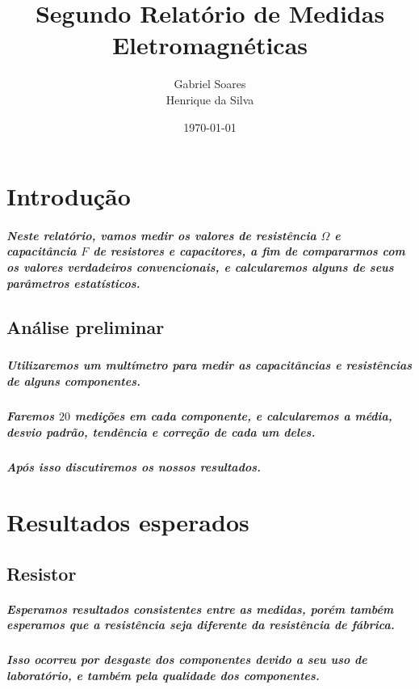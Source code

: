 \documentclass[12pt,twoside, a4paper, twocolumn]{article}
\title{Segundo Relatório de Medidas Eletromagnéticas}
\author{Gabriel Soares \\ Henrique da Silva}
\date{\today}
\begin{document}
\maketitle
{}
\newpage
\tableofcontents
\newpage



\section{Introdução}


\subparagraph*{Neste relatório, vamos medir os valores de resistência $\varOmega$ e capacitância $F$ de resistores e capacitores, a fim de compararmos com os valores verdadeiros convencionais, e calcularemos alguns de seus parâmetros estatísticos.}





\subsection{Análise preliminar}
\subparagraph*{}


\subparagraph*{Utilizaremos um multímetro para medir as capacitâncias e resistências de alguns componentes.}

\subparagraph*{Faremos $20$ medições em cada componente, e calcularemos a média, desvio padrão, tendência e correção de cada um deles.}

\subparagraph*{Após isso discutiremos os nossos resultados.}

\section{Resultados esperados}

\subsection{Resistor}

\subparagraph*{Esperamos resultados consistentes entre as medidas, porém também esperamos que a resistência seja diferente da resistência de fábrica.}

\subparagraph*{Isso ocorreu por desgaste dos componentes devido a seu uso de laboratório, e também pela qualidade dos componentes.}
\end{document}
